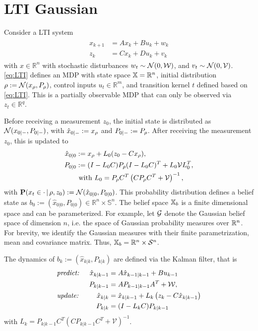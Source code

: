 \documentclass{ifacconf}
\begin{document}
\section{LTI Gaussian}\label{sec:case}

Consider a LTI system
 \begin{align} \label{eq:LTI} \begin{aligned}
x_{k+1}&=A x_{k} + B u_k+ w_k\\
z_k&=Cx_k+Du_k+v_k\end{aligned} \end{align}
with $x\in \mathbb{R}^n$ with stochastic disturbances $w_t\sim \mathcal N(0,\mathcal{W})$,  and $v_t\sim \mathcal N(0,\mathcal{V})$. 
 \eqref{eq:LTI}  defines an MDP with state space ${\mathbb{X}}=\mathbb R^n$,  initial distribution  $\rho:=\mathcal N(x_\rho,P_\rho)$,  control inputs $u_t\in\mathbb R^m$, and transition kernel $t$ defined based on  \eqref{eq:LTI}. This is a partially observable MDP that can only be observed via  $z_t\in\mathbb R^q$.
 
 
Before receiving a measurement $z_0$, the initial state is distributed  as $\mathcal{N}(x_{0|-}, P_{0|-})$, 	with $\hat x_{0|-}:= x_\rho$ and $P_{0|-}:= P_{\rho}$.
After receiving the measurement $z_0$, this is updated to \begin{align*}
	\hat x_{0|0}&:= x_\rho+ L_0 (z_0-Cx_\rho),\\
	P_{0|0}&:=(I-L_0 C) P_{\rho}(I-L_0 C)^T+L_0\mathcal{V} L_0^T,\\
	& \mbox{ with } L_0=P_{\rho}C^T\left(CP_{\rho}C^T+\mathcal V\right)^{-1},
\end{align*}
with $\mathbf{P}(x_t\in \cdot\,|\,\rho,z_0):=\mathcal{N}(\hat x_{0|0}, P_{0|0})$.
This probability distribution defines a belief state as $b_0:=(\hat x_{0|0}, P_{0|0})\in\mathbb R^n\times \mathbb S^n$. The belief space ${{\mathbb{X}}_b}$ is  a finite dimensional space and can be parameterized. For example, let $\mathcal{G}$ denote the Gaussian belief space
    of dimension $n$, i.e. the space of Gaussian
    probability measures over $\mathbb{R}^n$.
    For brevity, we identify the Gaussian measures
    with their finite parametrization, mean and
    covariance matrix.
     Thus,
    ${{\mathbb{X}}_b} =  \mathbb{R}^n \times  \mathcal S^n$.


The dynamics of  $b_k:=(\hat x_{k|k}, P_{k|k})$ are defined via the 
 Kalman filter, that is
	\begin{align*}
	&\text{\it predict: }&\hat x_{k|k-1}&=A\hat x_{k-1|k-1}+Bu_{k-1} \\
	&&P_{k|k-1}&=AP_{k-1|k-1}A^T+\mathcal W,
\\
	&\text{\it update: }&\hat x_{k|k}&=\hat x_{k|k-1}+L_k\left(z_k-C \hat x_{k|k-1}\right)\\
	&&P_{k|k}&=(I-L_kC)P_{k|k-1}
	\end{align*}
	with  $L_{k}=P_{k|k-1}C^T\left(CP_{k|k-1}C^T+\mathcal V\right)^{-1}$.
 
\end{document}
